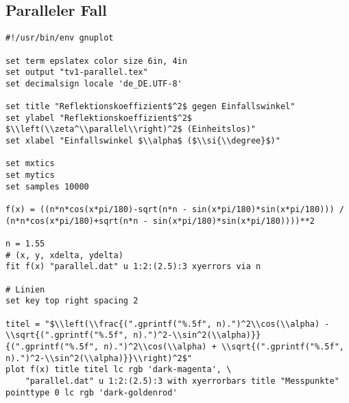     \subsection{Paralleler Fall}
    \label{appdx:tv1-parl-gp}
    {  
        \renewcommand{\fcolorbox}[4][]{#4}
        \begin{verbatim}
#!/usr/bin/env gnuplot

set term epslatex color size 6in, 4in
set output "tv1-parallel.tex"
set decimalsign locale 'de_DE.UTF-8'

set title "Reflektionskoeffizient$^2$ gegen Einfallswinkel"
set ylabel "Reflektionskoeffizient$^2$ $\\left(\\zeta^\\parallel\\right)^2$ (Einheitslos)"
set xlabel "Einfallswinkel $\\alpha$ ($\\si{\\degree}$)"

set mxtics
set mytics
set samples 10000

f(x) = ((n*n*cos(x*pi/180)-sqrt(n*n - sin(x*pi/180)*sin(x*pi/180))) / (n*n*cos(x*pi/180)+sqrt(n*n - sin(x*pi/180)*sin(x*pi/180))))**2

n = 1.55
# (x, y, xdelta, ydelta)
fit f(x) "parallel.dat" u 1:2:(2.5):3 xyerrors via n

# Linien
set key top right spacing 2

titel = "$\\left(\\frac{(".gprintf("%.5f", n).")^2\\cos(\\alpha) - \\sqrt{(".gprintf("%.5f", n).")^2-\\sin^2(\\alpha)}}{(".gprintf("%.5f", n).")^2\\cos(\\alpha) + \\sqrt{(".gprintf("%.5f", n).")^2-\\sin^2(\\alpha)}}\\right)^2$"
plot f(x) title titel lc rgb 'dark-magenta', \
    "parallel.dat" u 1:2:(2.5):3 with xyerrorbars title "Messpunkte" pointtype 0 lc rgb 'dark-goldenrod'
        \end{verbatim}
    }
